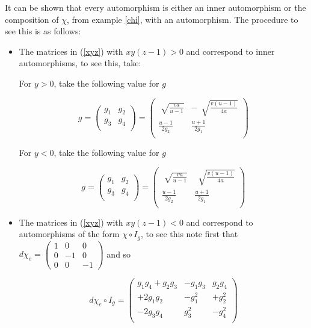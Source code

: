 \documentclass[11pt]{amsart}
\theoremstyle{plain}
\theoremstyle{definition}
\theoremstyle{remark}
\begin{document}
It can be shown that every automorphism is either an inner automorphism or the composition of $\chi$, from example \ref{chi}, with an automorphism. The procedure to see this is as follows:

\begin{itemize}
    \item The matrices in (\ref{xyz}) with $x y (z-1)>0$ and correspond to inner automorphisms, to see this, take:
    
    
        \subitem For $y>0$, take the following value for $g$
    
    
    \[g=\left( {\begin{array}{cc}
   g_1 & g_2 \\
   g_3 & g_4 \\
  \end{array} } \right)=\left( {\begin{array}{cc}
    \sqrt[]{\frac{va}{u-1}} & - \, \sqrt[]{\frac{v(u-1)}{4a}} \\
   \frac{u-1}{2g_2} & \frac{u+1}{2g_1} \\
  \end{array} } \right)
\]
    
    \subitem For $y<0$, take the following value for $g$
    
        \[g=\left( {\begin{array}{cc}
   g_1 & g_2 \\
   g_3 & g_4 \\
  \end{array} } \right)=\left( {\begin{array}{cc}
    \sqrt[]{\frac{va}{u-1}} &  \, \sqrt[]{\frac{v(u-1)}{4a}} \\
   \frac{u-1}{2g_2} & \frac{u+1}{2g_1} \\
  \end{array} } \right)
\]
    
        \item The matrices in (\ref{xyz}) with $x y (z-1)<0$ and correspond to automorphisms of the form $\chi \circ I_g$, to see this note first that $d\chi_e =  \left(\begin{array}{ccc}
1 & 0 & 0 \\
0 & -1 & 0 \\
0 & 0 & -1 \end{array} \right)$ and so


\[ d\chi_e \circ I_g =  \left(\begin{array}{ccc}
   g_1g_4+g_2g_3 & -g_1g_3 & g_2g_4 \\
   +2g_1g_2 & -g_1^2 & +g_2^2 \\
   -2g_3g_4 & g_3^2 & -g_4^2 \\
\end{array} \right) \]
        

\end{itemize}
\end{document}
